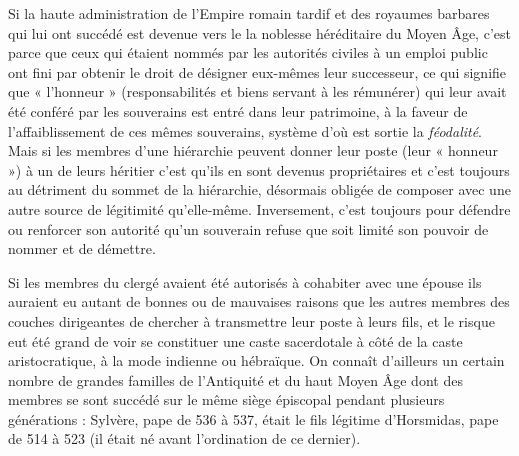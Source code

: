  Si la haute administration de l'Empire romain tardif et des royaumes barbares qui lui ont succédé est devenue vers le  la noblesse héréditaire du Moyen Âge, c'est parce que ceux qui étaient nommés par les autorités civiles à un emploi public ont fini par obtenir le droit de désigner eux-mêmes leur successeur, ce qui signifie que « l'honneur » (responsabilités et biens servant à les rémunérer) qui leur avait été conféré par les souverains est entré dans leur patrimoine, à la faveur de l'affaiblissement de ces mêmes souverains, système d'où est sortie la \emph{féodalité}. Mais si les membres d'une hiérarchie peuvent donner leur poste (leur « honneur ») à un de leurs héritier c'est qu'ils en sont devenus propriétaires et c'est toujours au détriment du sommet de la hiérarchie, désormais obligée de composer avec une autre source de légitimité qu'elle-même. Inversement, c'est toujours pour défendre ou renforcer son autorité qu'un souverain refuse que soit limité son pouvoir de nommer et de démettre.
 
  Si les membres du clergé avaient été autorisés à cohabiter avec une épouse ils auraient eu autant de bonnes ou de mauvaises raisons que les autres membres des couches dirigeantes de chercher à transmettre leur poste à leurs fils,  et le risque eut été grand de voir se constituer une caste sacerdotale à côté de la caste aristocratique, à la mode indienne ou hébraïque. On connaît d'ailleurs un certain nombre de grandes familles de l'Antiquité et du haut Moyen Âge dont des membres se sont succédé sur le même siège épiscopal pendant plusieurs générations : Sylvère, pape de 536 à 537, était le fils légitime d'Horsmidas, pape de 514 à 523 (il était né avant l'ordination de ce dernier). 

